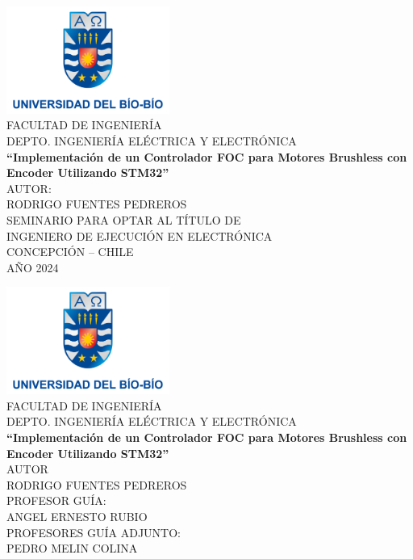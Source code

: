 \documentclass[11pt]{report}
\begin{document}
\begin{titlepage}
  \begin{center}
    \includegraphics[width=0.4\textwidth]{imagenes/logo_ubb.png}\\
    \normalsize FACULTAD DE INGENIERÍA\\
    DEPTO. INGENIERÍA ELÉCTRICA Y ELECTRÓNICA\\[2cm]
    
    \LARGE \textbf{``Implementación de un Controlador FOC para Motores Brushless con Encoder Utilizando STM32''}\\[6cm]
    
    \normalsize AUTOR:\\
    RODRIGO FUENTES PEDREROS\\[3cm]
    
    SEMINARIO PARA OPTAR AL TÍTULO DE\\
    INGENIERO DE EJECUCIÓN EN ELECTRÓNICA\\[1cm]
    
    CONCEPCIÓN – CHILE\\
    AÑO 2024\\
  \end{center}
\end{titlepage}

\begin{titlepage}
  \begin{center}
    \includegraphics[width=0.4\textwidth]{imagenes/logo_ubb.png}\\
    \normalsize FACULTAD DE INGENIERÍA\\
    DEPTO. INGENIERÍA ELÉCTRICA Y ELECTRÓNICA\\[2cm]
    
    \LARGE \textbf{``Implementación de un Controlador FOC para Motores Brushless con Encoder Utilizando STM32''}\\[5cm]
    
    \normalsize AUTOR\\
    RODRIGO FUENTES PEDREROS\\[3cm]
    
    \large PROFESOR GUÍA:\\
    \large ANGEL ERNESTO RUBIO\\[1cm]
    \large PROFESORES GUÍA ADJUNTO:\\
    \large PEDRO MELIN COLINA
  \end{center}
\end{titlepage}
\end{document}
